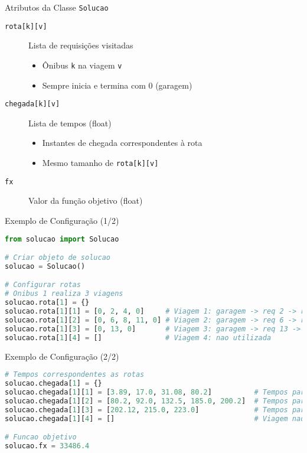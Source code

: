\documentclass[10pt]{beamer}
\begin{document}
\begin{frame}{Atributos da Classe \texttt{Solucao}}
    \begin{description}
        \item[\texttt{rota[k][v]}] Lista de requisições visitadas
        \begin{itemize}
            \item Ônibus \texttt{k} na viagem \texttt{v}
            \item Sempre inicia e termina com 0 (garagem)
        \end{itemize}
        
        \vspace{0.3cm}
        
        \item[\texttt{chegada[k][v]}] Lista de tempos (float)
        \begin{itemize}
            \item Instantes de chegada correspondentes à rota
            \item Mesmo tamanho de \texttt{rota[k][v]}
        \end{itemize}
        
        \vspace{0.3cm}
        
        \item[\texttt{fx}] Valor da função objetivo (float)
    \end{description}
\end{frame}

\begin{frame}[fragile]{Exemplo de Configuração (1/2)}
    \begin{lstlisting}[language=Python]
from solucao import Solucao

# Criar objeto de solucao
solucao = Solucao()

# Configurar rotas
# Onibus 1 realiza 3 viagens
solucao.rota[1] = {}
solucao.rota[1][1] = [0, 2, 4, 0]     # Viagem 1: garagem -> req 2 -> req 4 -> garagem
solucao.rota[1][2] = [0, 6, 8, 11, 0] # Viagem 2: garagem -> req 6 -> req 8 -> req 11 -> garagem
solucao.rota[1][3] = [0, 13, 0]       # Viagem 3: garagem -> req 13 -> garagem
solucao.rota[1][4] = []               # Viagem 4: nao utilizada
    \end{lstlisting}
\end{frame}

\begin{frame}[fragile]{Exemplo de Configuração (2/2)}
    \begin{lstlisting}[language=Python]
# Tempos correspondentes as rotas
solucao.chegada[1] = {}
solucao.chegada[1][1] = [3.89, 17.0, 31.08, 80.2]          # Tempos para rota[1][1]
solucao.chegada[1][2] = [80.2, 92.0, 132.5, 185.0, 200.2]  # Tempos para rota[1][2]
solucao.chegada[1][3] = [202.12, 215.0, 223.0]             # Tempos para rota[1][3]
solucao.chegada[1][4] = []                                 # Viagem nao utilizada

# Funcao objetivo
solucao.fx = 33486.4
    \end{lstlisting}
\end{frame}
\end{document}
